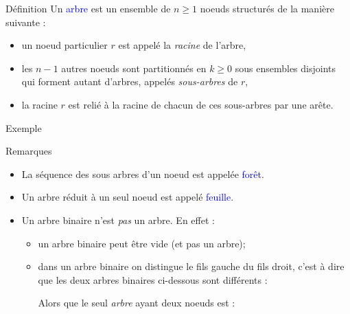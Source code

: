 \documentclass[10pt]{beamer}
\begin{document}
\begin{frame}[fragile]{\Ctitle}{\stitle}
	\begin{alertblock}{Définition}
		Un \textcolor{blue}{arbre} est un ensemble de $n \geqslant 1$ noeuds structurés de la manière suivante :
		\begin{itemize}
			\item un noeud particulier $r$ est appelé la \textit{racine} de l'arbre,
			\item les $n-1$ autres noeuds sont partitionnés en $k \geqslant 0$ sous ensembles disjoints qui forment autant d'arbres, appelés \textit{sous-arbres} de $r$,
			\item la racine $r$ est relié à la racine de chacun de ces sous-arbres par une arête.
		\end{itemize}
	\end{alertblock}
	\begin{exampleblock}{Exemple}
		\begin{center}
		\end{center}
	\end{exampleblock}
\end{frame}

\begin{frame}[fragile]{\Ctitle}{\stitle}
	\begin{block}{Remarques}
		\begin{itemize}
		\item La séquence des sous arbres d'un noeud est appelée \textcolor{blue}{forêt}.
		\item Un arbre réduit à un seul noeud est appelé \textcolor{blue}{feuille}.
		\item \textcolor{BrickRed}{\small \danger \;} Un arbre binaire n'est \textcolor{BrickRed}{\textit{pas}} un arbre. En effet :
		\begin{itemize}
		\item  un arbre binaire peut être vide (et pas un arbre);
		\item dans un arbre binaire on distingue le fils gauche du fils droit, c'est à dire que les deux arbres binaires ci-dessous sont différents :
			\begin{center}
				 \qquad {}
			\end{center}
			Alors que le seul \textit{arbre} ayant deux noeuds est :
			\begin{center}\end{center}
		\end{itemize}
		\end{itemize}
	\end{block}
\end{frame}
\end{document}
